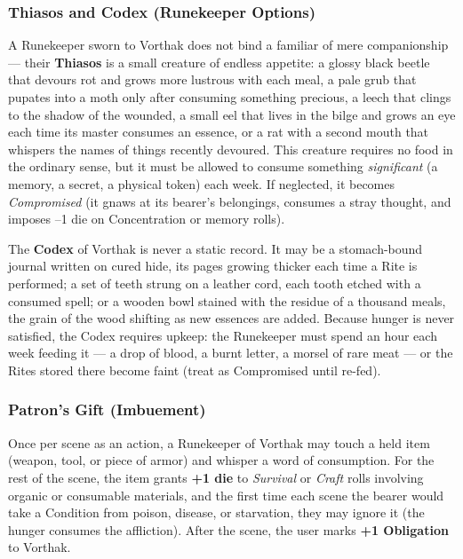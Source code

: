\subsubsection*{Thiasos and Codex (Runekeeper Options)}

A Runekeeper sworn to Vorthak does not bind a familiar of mere companionship --- their \textbf{Thiasos} is a small creature of endless appetite: a glossy black beetle that devours rot and grows more lustrous with each meal, a pale grub that pupates into a moth only after consuming something precious, a leech that clings to the shadow of the wounded, a small eel that lives in the bilge and grows an eye each time its master consumes an essence, or a rat with a second mouth that whispers the names of things recently devoured. This creature requires no food in the ordinary sense, but it must be allowed to consume something \textit{significant} (a memory, a secret, a physical token) each week. If neglected, it becomes \textit{Compromised} (it gnaws at its bearer's belongings, consumes a stray thought, and imposes --1 die on Concentration or memory rolls).

The \textbf{Codex} of Vorthak is never a static record. It may be a stomach-bound journal written on cured hide, its pages growing thicker each time a Rite is performed; a set of teeth strung on a leather cord, each tooth etched with a consumed spell; or a wooden bowl stained with the residue of a thousand meals, the grain of the wood shifting as new essences are added. Because hunger is never satisfied, the Codex requires upkeep: the Runekeeper must spend an hour each week feeding it --- a drop of blood, a burnt letter, a morsel of rare meat --- or the Rites stored there become faint (treat as Compromised until re-fed).

\subsubsection*{Patron's Gift (Imbuement)}

Once per scene as an action, a Runekeeper of Vorthak may touch a held item (weapon, tool, or piece of armor) and whisper a word of consumption. For the rest of the scene, the item grants \textbf{+1 die} to \textit{Survival} or \textit{Craft} rolls involving organic or consumable materials, and the first time each scene the bearer would take a Condition from poison, disease, or starvation, they may ignore it (the hunger consumes the affliction). After the scene, the user marks \textbf{+1 Obligation} to Vorthak.

